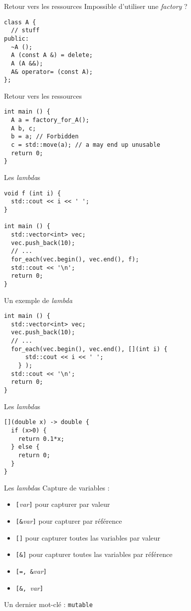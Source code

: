 \begin{frame}[fragile]{Retour vers les ressources}
  Impossible d'utiliser une \textit{factory} ?
  
  \begin{lstlisting}
class A {
  // stuff
public:
  ~A ();
  A (const A &) = delete;
  A (A &&);
  A& operator= (const A);
};
  \end{lstlisting}
\end{frame}

\begin{frame}[fragile]{Retour vers les ressources}
  \begin{lstlisting}
int main () {
  A a = factory_for_A();
  A b, c;
  b = a; // Forbidden
  c = std::move(a); // a may end up unusable
  return 0;
}
  \end{lstlisting}
\end{frame}

\begin{frame}[fragile]{Les \textit{lambda}s}
  \begin{lstlisting}
void f (int i) {
  std::cout << i << ' ';
}

int main () {
  std::vector<int> vec;
  vec.push_back(10);
  // ...
  for_each(vec.begin(), vec.end(), f);
  std::cout << '\n';
  return 0;
}
  \end{lstlisting}
\end{frame}

\begin{frame}[fragile]{Un exemple de \textit{lambda}}
  \begin{lstlisting}
int main () {
  std::vector<int> vec;
  vec.push_back(10);
  // ...
  for_each(vec.begin(), vec.end(), [](int i) {
      std::cout << i << ' ';
    } );
  std::cout << '\n';
  return 0;
}
  \end{lstlisting}
\end{frame}

\begin{frame}[fragile]{{Les \textit{lambda}s}}
  \begin{lstlisting}
[](double x) -> double {
  if (x>0) {
    return 0.1*x;
  } else {
    return 0;
  }
}
  \end{lstlisting}
\end{frame}

\begin{frame}{{Les \textit{lambda}s}}
  Capture de variables :
  \begin{itemize}
  \item \texttt{[}\textit{var}\texttt{]} pour capturer par valeur
  \item \texttt{[\&}\textit{var}\texttt{]} pour capturer par référence
  \item \texttt{[]} pour capturer toutes las variables par valeur
  \item \texttt{[\&]} pour capturer toutes las variables par référence
  \item \texttt{[=, \&}\textit{var}\texttt{]}
  \item \texttt{[\&, }\textit{var}\texttt{]}
  \end{itemize}

  Un dernier mot-clé : \texttt{mutable}
\end{frame}

